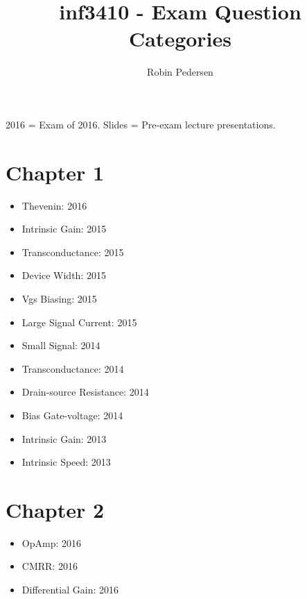 \documentclass[twocolumn]{article}
\begin{document}
  \title{inf3410 - Exam Question Categories}
  \author{Robin Pedersen}
  \maketitle

  2016 = Exam of 2016.
  Slides = Pre-exam lecture presentations.

  \section*{Chapter 1}
    \begin{itemize}
      \item Thevenin: 2016

      \item Intrinsic Gain: 2015
      \item Transconductance: 2015
      \item Device Width: 2015
      \item Vgs Biasing: 2015
      \item Large Signal Current: 2015

      \item Small Signal: 2014
      \item Transconductance: 2014
      \item Drain-source Resistance: 2014
      \item Bias Gate-voltage: 2014

      \item Intrinsic Gain: 2013
      \item Intrinsic Speed: 2013
    \end{itemize}
  \section*{Chapter 2}
    \begin{itemize}
      \item OpAmp: 2016
      \item CMRR: 2016
      \item Differential Gain: 2016
    \end{itemize}
\end{document}
